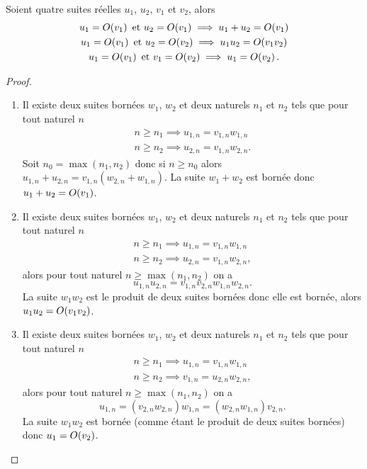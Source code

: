 \begin{prop}
  Soient quatre suites réelles \(u_1\), \(u_2\), \(v_1\) et \(v_2\), alors
  \begin{gather}
    u_1 = O\mathopen{}\left(v_1\right) \text{~et~} u_2 = O\mathopen{}\left(v_1\right) \implies u_1+u_2 = 
    O\mathopen{}\left(v_1\right)\\
    u_1 = O\mathopen{}\left(v_1\right) \text{~et~} u_2 = O\mathopen{}\left(v_2\right) \implies u_1u_2 = 
    O\mathopen{}\left(v_1 v_2\right)\\
    u_1 = O\mathopen{}\left(v_1\right) \text{~et~} v_1 = O\mathopen{}\left(v_2\right) \implies u_1 = 
    O\mathopen{}\left(v_2\right).
  \end{gather}
\end{prop}
\begin{proof}
  \begin{enumerate}
    \item Il existe deux suites bornées \(w_1\), \(w_2\) et deux naturels 
      \(n_1\) et \(n_2\) tels que pour tout naturel \(n\)
      \begin{align}
        n \geqslant n_1 \implies u_{1,n} = v_{1,n}w_{1,n} \\
        n \geqslant n_2 \implies u_{2,n} = v_{1,n}w_{2,n}.
      \end{align}
      Soit \(n_0 = \max(n_1,n_2)\) donc si \(n \geqslant n_0\) alors \(u_{1,n} + 
      u_{2,n}= v_{1,n} (w_{2,n}+w_{1,n})\). La suite \(w_{1} + w_{2}\) est 
      bornée donc \(u_1+u_2 = O\mathopen{}\left(v_1\right)\).
    \item Il existe deux suites bornées \(w_1\), \(w_2\) et deux naturels 
      \(n_1\) et \(n_2\) tels que pour tout naturel \(n\)
      \begin{align}
        n \geqslant n_1 \implies u_{1,n} = v_{1,n}w_{1,n} \\
        n \geqslant n_2 \implies u_{2,n} = v_{1,n}w_{2,n},
      \end{align}
      alors pour tout naturel \(n \geqslant \max(n_1,n_2)\) on a
      \begin{equation}
        u_{1,n} u_{2,n} = v_{1,n} v_{2,n} w_{1,n} w_{2,n}.
      \end{equation}
      La suite \(w_1 w_2\) est le produit de deux suites bornées donc elle est 
      bornée, alors \(u_1u_2 = O\mathopen{}\left(v_1v_2\right)\).
    \item Il existe deux suites bornées \(w_1\), \(w_2\) et deux naturels 
      \(n_1\) et \(n_2\) tels que pour tout naturel \(n\) \begin{align}
        n \geqslant n_1 \implies u_{1,n} = v_{1,n}w_{1,n} \\
      n \geqslant n_2 \implies v_{1,n} = u_{2,n}w_{2,n}, \end{align}
      alors pour tout naturel \(n \geqslant \max(n_1,n_2)\) on a
      \begin{equation}
        u_{1,n} = (v_{2,n} w_{2,n})w_{1,n} = (w_{2,n} w_{1,n}) v_{2,n}.
      \end{equation}
      La suite \(w_1 w_2\) est bornée (comme étant le produit de deux suites 
      bornées) donc \(u_1 = O\mathopen{}\left(v_2\right)\).
  \end{enumerate}
\end{proof}

